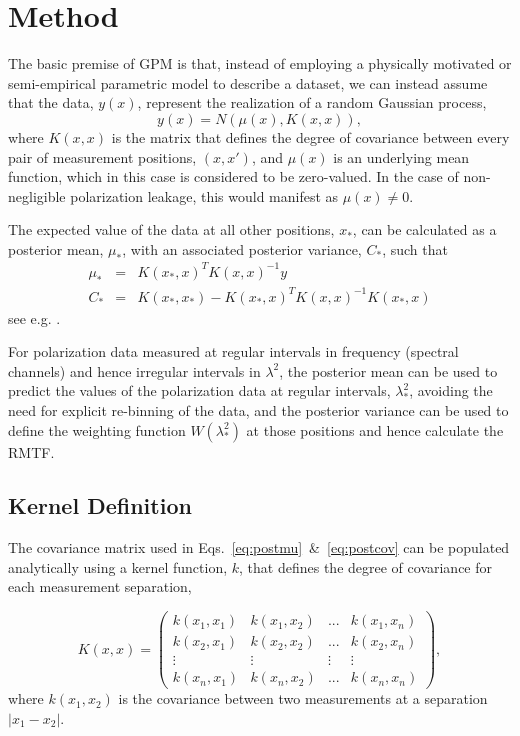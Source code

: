 \documentclass[fleqn,usenatbib]{mnras}
\begin{document}
\section{Method}
\label{sec:method}

The basic premise of GPM is that, instead of employing a physically motivated or semi-empirical parametric model to describe a dataset, we can instead assume that the data, $y(x)$, represent the realization of a random Gaussian process,
%
\begin{equation}
y(x) = N(\mu(x), K(x,x)),
\end{equation}
%
where $K(x,x)$ is the matrix that defines the degree of covariance between every pair of measurement positions, $(x,x')$, and $\mu(x)$ is an underlying mean function, which in this case is considered to be zero-valued. In the case of non-negligible polarization leakage, this would manifest as $\mu(x)\neq 0$.

The expected value of the data at all other positions, $x_{\ast}$, can be calculated as a posterior mean, $\mu_{\ast}$, with an associated posterior variance, $C_{\ast}$, such that
%
\begin{eqnarray}
\label{eq:postmu} \mu_{\ast} &=&  K(x_{\ast},x)^T K(x,x)^{-1} y  \\
\label{eq:postcov} C_{\ast} &=&  K(x_{\ast},x_{\ast}) - K(x_{\ast},x)^T K(x,x)^{-1} K(x_{\ast},x)
\end{eqnarray}
%
see e.g. \cite{3569, article}.

For polarization data measured at regular intervals in frequency (spectral channels) and hence irregular intervals in $\lambda^2$, the posterior mean can be used to predict the values of the polarization data at regular intervals, $\lambda_{\ast}^2$, avoiding the need for explicit re-binning of the data, and the posterior variance can be used to define the weighting function $W(\lambda_{\ast}^2)$ at those positions and hence calculate the RMTF.

\subsection{Kernel Definition}

The covariance matrix used in Eqs.~\ref{eq:postmu}~\&~\ref{eq:postcov} can be populated analytically using a kernel function, $k$, that defines the degree of covariance for each measurement separation,

\begin{equation}
K(x,x) = \left(
\begin{array}{cccc}
k(x_1,x_1) & k(x_1,x_2) & ... & k(x_1,x_n) \\
k(x_2,x_1) & k(x_2,x_2) & ... & k(x_2,x_n) \\
\vdots & \vdots & \vdots & \vdots \\
k(x_n,x_1) & k(x_n,x_2) & ... & k(x_n,x_n)
\end{array}
\right),
\end{equation}
%
where $k(x_1,x_2)$ is the covariance between two measurements at a separation $|x_1 - x_2|$.
\end{document}
